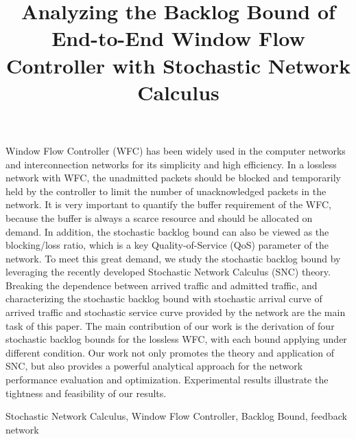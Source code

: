 \documentclass[paper]{ieice}
\title{Analyzing the Backlog Bound of End-to-End Window Flow Controller with Stochastic Network Calculus}
\begin{document}
\maketitle
\begin{summary}
Window Flow Controller (WFC) has been widely used in the computer networks and interconnection networks for its simplicity and high efficiency. In a lossless network with WFC, the unadmitted packets should be blocked and temporarily held by the controller to limit the number of unacknowledged packets in the network. It is very important to quantify the buffer requirement of the WFC, because the buffer is always a scarce resource and should be allocated on demand. In addition, the stochastic backlog bound can also be viewed as the blocking/loss ratio, which is a key Quality-of-Service (QoS) parameter of the network. To meet this great demand, we study the stochastic backlog bound by leveraging the recently developed Stochastic Network Calculus (SNC) theory. Breaking the dependence between arrived traffic and admitted traffic, and characterizing the stochastic backlog bound with stochastic arrival curve of arrived traffic and stochastic service curve provided by the network are the main task of this paper. The main contribution of our work is the derivation of four stochastic backlog bounds for the lossless WFC, with each bound applying under different condition. Our work not only promotes the theory and application of SNC, but also provides a powerful analytical approach for the network performance evaluation and optimization. Experimental results illustrate the tightness and feasibility of our results. %
\end{summary}
\begin{keywords}
Stochastic Network Calculus, Window Flow Controller, Backlog Bound, feedback network
\end{keywords}
\end{document}
